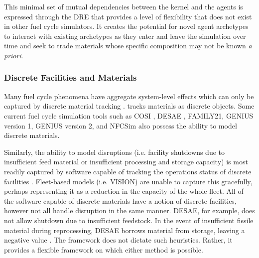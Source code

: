 This minimal set of mutual dependencies between the kernel and the agents is
expressed through the \gls{DRE} that provides a level of flexibility that does
not exist in other fuel cycle simulators.  It creates the potential for novel
agent archetypes to interact with existing archetypes as they enter and leave
the simulation over time and seek to trade materials whose specific
composition may not be known \textit{a priori}.

\subsubsection{Discrete Facilities and Materials}

Many fuel cycle phenomena have aggregate system-level effects which can only be
captured by discrete material tracking \cite{huff_next_2010}.  \Cyclus
tracks materials as discrete objects. Some current fuel cycle simulation tools
such as \gls{COSI}
\cite{mccarthy_benchmark_2012,grasso_nea-wpfc/fcts_2009,guerin_benchmark_2009},
\gls{DESAE}
\cite{andrianova_desae_2008}, FAMILY21\cite{mccarthy_benchmark_2012},
\gls{GENIUS} version 1, \gls{GENIUS} version 2, and \gls{NFCSim} also possess the ability to
model discrete materials.

Similarly, the ability to model disruptions (i.e. facility shutdowns due to
insufficient feed material or insufficient processing and storage capacity) is
most readily captured by software capable of tracking the operations status of
discrete facilities \cite{huff_next_2010}.  Fleet-based models (i.e.
\gls{VISION}) are unable to capture this gracefully, perhaps representing it as
a reduction in the capacity of the whole fleet.  All of the software
capable of discrete materials have a notion of discrete facilities, however not
all handle disruption in the same manner. \gls{DESAE}, for example, does not
allow shutdown due to insufficient feedstock. In the event
of insufficient fissile material during reprocessing, \gls{DESAE} borrows
material from storage, leaving a negative value \cite{mccarthy_benchmark_2012}.
The \Cyclus framework does not dictate such heuristics. Rather, it provides a
flexible framework on which either method is possible.
